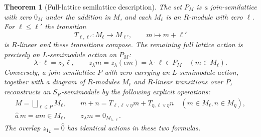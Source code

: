 \documentclass[11pt]{article}
\newtheorem{theorem}{Theorem}
\begin{document}
\begin{theorem}[Full-lattice semilattice description]\label{sh:modules}
The set $P_M$ is a join-semilattice with zero $0_M$ under the
addition in $M$, and each $M_\ell$ is an $R$-module with zero
$\ell$. For $\ell\le\ell'$ the transition
\begin{equation}\tag{SH11}\label{sh:transport}
 T_{\ell,\ell'}:M_\ell\to M_{\ell'},\qquad
 m\mapsto m+\ell'
\end{equation}
is $R$-linear and these transitions compose. The remaining full
lattice action is precisely an $L$-semimodule action on $P_M$:
\begin{equation}\tag{SH12}\label{sh:laction}
 \lambda\cdot\ell=z_\lambda\ell,\qquad
 z_\lambda m=z_\lambda(em)=\lambda\cdot\ell\in P_M
 \quad(m\in M_\ell).
\end{equation}
Conversely, a join-semilattice $P$ with zero carrying an
$L$-semimodule action, together with a diagram of $R$-modules
$M_\ell$ and $R$-linear transitions over $P$, reconstructs an
$S_R$-semimodule by the following explicit operations:
\begin{equation}\tag{SH13}\label{sh:reconstruction}
 \begin{gathered}
 M=\bigsqcup_{\ell\in P}M_\ell,\qquad
 m+n=T_{\ell,\ell\vee\eta}m+
             T_{\eta,\ell\vee\eta}n
       \quad(m\in M_\ell,n\in M_\eta),\\
 \widehat a\,m=am\in M_\ell,\qquad
 z_\lambda m=0_{M_{\lambda\cdot\ell}}.
 \end{gathered}
\end{equation}
The overlap $z_{1_L}=\widehat0$ has identical actions in these
two formulas.
\end{theorem}
\end{document}
